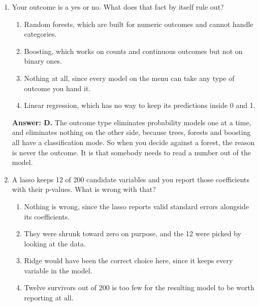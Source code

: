 \documentclass[11pt]{article}
\begin{document}
\begin{enumerate}[itemsep=14pt]
\vspace{2pt}
\textbf{Answer: C.} Fitting settles the parts the data has an opinion about: split points, slopes, weights. Depth, fold count and penalty size are settings you fix in advance, and no amount of fitting will choose them for you. Unit 4 covers how to make those choices without fooling yourself.
\vspace{4pt}

\item Your outcome is a yes or no. What does that fact by itself rule out?

\begin{enumerate}[label=\Alph*., itemsep=1pt, topsep=3pt]
  \item Random forests, which are built for numeric outcomes and cannot handle categories.
  \item Boosting, which works on counts and continuous outcomes but not on binary ones.
  \item Nothing at all, since every model on the menu can take any type of outcome you hand it.
  \item Linear regression, which has no way to keep its predictions inside 0 and 1.
\end{enumerate}

\vspace{2pt}
\textbf{Answer: D.} The outcome type eliminates probability models one at a time, and eliminates nothing on the other side, because trees, forests and boosting all have a classification mode. So when you decide against a forest, the reason is never the outcome. It is that somebody needs to read a number out of the model.
\vspace{4pt}

\item A lasso keeps 12 of 200 candidate variables and you report those coefficients with their p-values. What is wrong with that?

\begin{enumerate}[label=\Alph*., itemsep=1pt, topsep=3pt]
  \item Nothing is wrong, since the lasso reports valid standard errors alongside its coefficients.
  \item They were shrunk toward zero on purpose, and the 12 were picked by looking at the data.
  \item Ridge would have been the correct choice here, since it keeps every variable in the model.
  \item Twelve survivors out of 200 is too few for the resulting model to be worth reporting at all.
\end{enumerate}


\end{enumerate}
\end{document}
